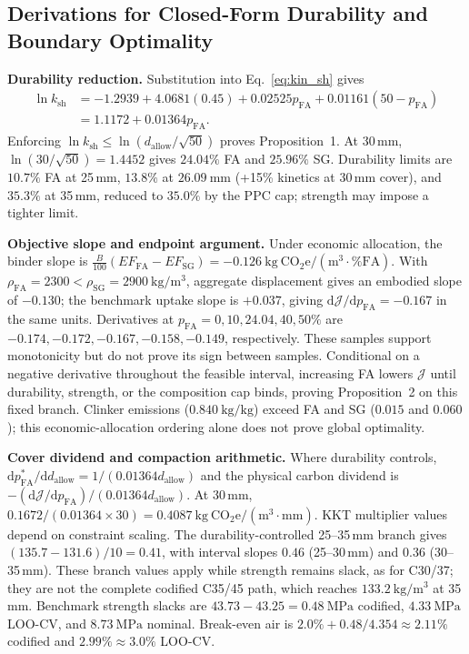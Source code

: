\documentclass[journal]{IEEEtran}
\begin{document}
\subsection{Derivations for Closed-Form Durability and Boundary Optimality}
\label{sec:appendix_propositions}
{\footnotesize
\noindent\textbf{Durability reduction.} Substitution into Eq.~\ref{eq:kin_sh} gives 
\[
\begin{aligned}
\ln k_{\mathrm{sh}}&=-1.2939+4.0681(0.45)+0.02525p_{\mathrm{FA}}+0.01161(50-p_{\mathrm{FA}}) \\
&=1.1172+0.01364p_{\mathrm{FA}}.
\end{aligned}
\]
Enforcing $\ln k_{\mathrm{sh}}\le\ln(d_{\mathrm{allow}}/\sqrt{50})$ proves Proposition~1. At 30\,mm, $\ln(30/\sqrt{50})=1.4452$ gives $24.04\%$ FA and $25.96\%$ SG. Durability limits are $10.7\%$ FA at 25\,mm, $13.8\%$ at $26.09\ \mathrm{mm}$ (+15\% kinetics at 30\,mm cover), and $35.3\%$ at 35\,mm, reduced to $35.0\%$ by the PPC cap; strength may impose a tighter limit.

\medskip
\noindent\textbf{Objective slope and endpoint argument.} Under economic allocation, the binder slope is $\frac{B}{100}(EF_{\mathrm{FA}}-EF_{\mathrm{SG}})=-0.126\ \mathrm{kg\ CO_2e/(m^3\cdot\%FA)}$. With $\rho_{\mathrm{FA}}=2300<\rho_{\mathrm{SG}}=2900\ \mathrm{kg/m^3}$, aggregate displacement gives an embodied slope of $-0.130$; the benchmark uptake slope is $+0.037$, giving $\mathrm d\mathcal J/\mathrm dp_{\mathrm{FA}}=-0.167$ in the same units. Derivatives at $p_{\mathrm{FA}}=0,10,24.04,40,50\%$ are $-0.174,-0.172,-0.167,-0.158,-0.149$, respectively. These samples support monotonicity but do not prove its sign between samples. Conditional on a negative derivative throughout the feasible interval, increasing FA lowers $\mathcal J$ until durability, strength, or the composition cap binds, proving Proposition~2 on this fixed branch. Clinker emissions ($0.840\ \mathrm{kg/kg}$) exceed FA and SG ($0.015$ and $0.060$); this economic-allocation ordering alone does not prove global optimality.

\medskip
\noindent\textbf{Cover dividend and compaction arithmetic.} Where durability controls, $\mathrm dp_{\mathrm{FA}}^*/\mathrm dd_{\mathrm{allow}}=1/(0.01364d_{\mathrm{allow}})$ and the physical carbon dividend is $-(\mathrm d\mathcal J/\mathrm dp_{\mathrm{FA}})/(0.01364d_{\mathrm{allow}})$. At 30\,mm, $0.1672/(0.01364\times30)=0.4087\ \mathrm{kg\ CO_2e/(m^3\cdot mm)}$. KKT multiplier values depend on constraint scaling. The durability-controlled 25--35\,mm branch gives $(135.7-131.6)/10=0.41$, with interval slopes $0.46$ (25--30\,mm) and $0.36$ (30--35\,mm). These branch values apply while strength remains slack, as for C30/37; they are not the complete codified C35/45 path, which reaches $133.2\ \mathrm{kg/m^3}$ at 35\,mm. Benchmark strength slacks are $43.73-43.25=0.48\ \mathrm{MPa}$ codified, $4.33\ \mathrm{MPa}$ LOO-CV, and $8.73\ \mathrm{MPa}$ nominal. Break-even air is $2.0\%+0.48/4.354\approx2.11\%$ codified and $2.99\%\approx3.0\%$ LOO-CV.
}
\end{document}
